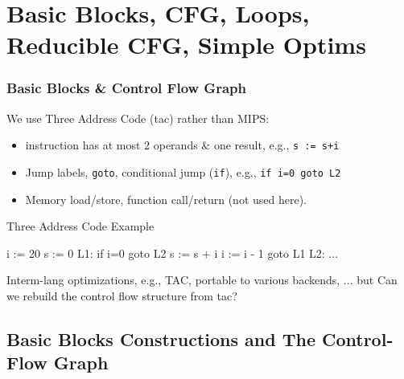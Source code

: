\documentclass{beamer}
\newcommand{\emp}[1]{\textcolor{DikuRed}{ #1}}
\begin{document}
\begin{frame}[fragile,t]
\end{frame}


\section{Basic Blocks, CFG, Loops, Reducible CFG, Simple Optims}

\begin{frame}[fragile]
	\tableofcontents[currentsection]
\end{frame}


\begin{frame}[fragile,t]
    \frametitle{Basic Blocks \& Control Flow Graph}

We use Three Address Code ({\sc tac}) rather than MIPS:\smallskip\pause
\begin{itemize}
\item instruction has at most 2 operands \& one result, e.g., {\tt s := s+i}\smallskip
\item Jump labels, {\tt goto}, conditional jump ({\tt if}), e.g., {\tt if i=0 goto L2}\smallskip
\item Memory load/store, function call/return (not used here).\smallskip
\end{itemize}

\bigskip

\begin{block}{Three Address Code Example}
\begin{colorcode}[fontsize=\scriptsize]
    i := 20
    s := 0
L1: if i=0 \emp{goto L2}
    s := s + i
    i := i - 1
    \emp{goto L1}
L2: ...
\end{colorcode} 
\end{block}

\bigskip

Interm-lang optimizations, e.g., \textsc{TAC}, portable to various backends, \smallskip
$\ldots$ but \emp{Can we rebuild the control flow structure from {\sc tac}?}

\end{frame}

\subsection{Basic Blocks Constructions and The Control-Flow Graph}
\end{document}
